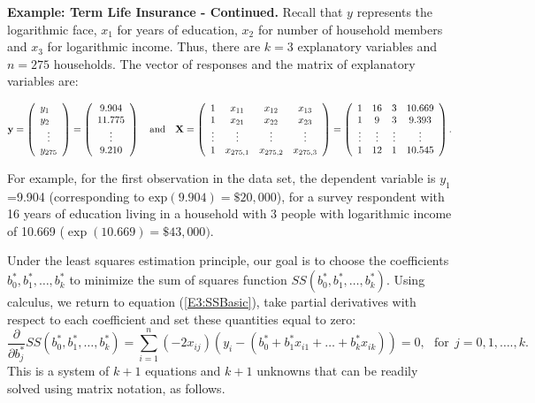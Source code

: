 \textbf{Example: Term Life Insurance - Continued.} Recall that $y$
represents the logarithmic face, $x_1$ for years of education, $x_2$
for number of household members and $x_3$ for logarithmic income.
Thus, there are $k=3$ explanatory variables and $n=275$ households.
The vector of responses and the matrix of explanatory variables are:

\begin{equation*}
\mathbf{y}=\left(
\begin{array}{l}
y_1 \\
y_2 \\
\multicolumn{1}{c}{\vdots} \\
y_{275}%
\end{array}%
\right) =\left(
\begin{array}{c}
9.904 \\
11.775 \\
\vdots \\
9.210
\end{array}%
\right) ~~~\mathrm{and}~~~\mathbf{X}=\left(
\begin{array}{cccc}
1 & x_{11} & x_{12} & x_{13} \\
1 & x_{21} & x_{22} & x_{23}\\
\vdots & \vdots & \vdots &\vdots\\
1 & x_{275,1} & x_{275,2} & x_{275,3}%
\end{array}%
\right) =\left(
\begin{array}{cccc}
1 & 16 & 3  & 10.669\\
1 & 9 & 3 & 9.393\\
\vdots & \vdots & \vdots &\vdots\\
1 & 12 & 1 & 10.545%
\end{array}%
\right) .
\end{equation*}


\noindent For example, for the first observation in the data set,
the dependent variable is $y_1$=9.904 (corresponding to
$\textrm{exp}(9.904)= \$ 20,000$), for a survey respondent with 16
years of education living in a household with 3 people with
logarithmic income of 10.669 ($\exp (10.669)= \$ 43,000)$.

\linejed

Under the least squares estimation principle, our goal is to choose
the coefficients $b_0^{\ast},b_1^{\ast},\ldots,b_k^{\ast}$ to
minimize the sum of squares function
$SS(b_0^{\ast},b_1^{\ast},\ldots,b_k^{\ast})$. Using calculus, we
return to equation (\ref{E3:SSBasic}), take partial derivatives with
respect to each coefficient and set these quantities equal to zero:
\begin{equation*}
\frac{\partial }{\partial
b_j^{\ast}}SS(b_0^{\ast},b_1^{\ast},\ldots,b_k^{\ast})=\sum_{i=1}^{n}\left(
-2x_{ij}\right) \left( y_i-\left(
b_0^{\ast}+b_1^{\ast}x_{i1}+\ldots+b_k^{\ast}x_{ik}\right) \right)
=0,~~~\mathrm{for}~~j=0,1,\ldots .,k.
\end{equation*}
This is a system of $k+1$ equations and $k+1$ unknowns that can be readily
solved using matrix notation, as follows.

